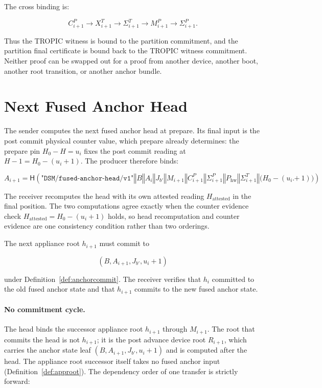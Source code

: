 \documentclass[11pt]{article}
\theoremstyle{definition}
\theoremstyle{remark}
\newcommand{\concat}{\ensuremath{\mathbin{\Vert}}}
\newcommand{\Hf}{\ensuremath{\mathsf{H}}}
\newcommand{\ctx}[1]{\texttt{"#1"}}
\newcommand{\Bundle}{\ensuremath{B}}
\newcommand{\Ahead}{\ensuremath{A}}
\newcommand{\Bhead}{\ensuremath{J}}
\newcommand{\pkh}{\ensuremath{P_{\mathrm{hw}}}}
\begin{document}
The cross binding is:

\[
C^P_{i+1}
\rightarrow X^T_{i+1}
\rightarrow \Sigma^T_{i+1}
\rightarrow M^P_{i+1}
\rightarrow \Sigma^P_{i+1}.
\]

Thus the TROPIC witness is bound to the partition commitment, and the partition final certificate
is bound back to the TROPIC witness commitment. Neither proof can be swapped out for a proof from
another device, another boot, another root transition, or another anchor bundle.

\section{Next Fused Anchor Head}

The sender computes the next fused anchor head at prepare. Its final input is the post commit
physical counter value, which prepare already determines: the prepare pin \(H_0-H=u_i\) fixes the
post commit reading at \(H-1=H_0-(u_i+1)\). The producer therefore binds:

\[
\Ahead_{i+1}
=
\Hf(
  \ctx{DSM/fused-anchor-head/v1}
  \concat \Bundle
  \concat \Ahead_i
  \concat \Bhead_{b'}
  \concat M_{i+1}
  \concat C^P_{i+1}
  \concat \Sigma^P_{i+1}
  \concat \pkh
  \concat \Sigma^T_{i+1}
  \concat \bigl(H_0-(u_i+1)\bigr)
).
\]

The receiver recomputes the head with its own attested reading \(H_{\mathrm{attested}}\) in the
final position. The two computations agree exactly when the counter evidence check
\(H_{\mathrm{attested}}=H_0-(u_i+1)\) holds, so head recomputation and counter evidence are one
consistency condition rather than two orderings.

The next appliance root \(h_{i+1}\) must commit to

\[
(
\Bundle,
\Ahead_{i+1},
\Bhead_{b'},
u_i+1
)
\]

under Definition~\ref{def:anchorcommit}. The receiver verifies that \(h_i\) committed to the old
fused anchor state and that \(h_{i+1}\) commits to the new fused anchor state.

\paragraph{No commitment cycle.}
The head binds the successor appliance root \(h_{i+1}\) through \(M_{i+1}\). The root that commits
the head is not \(h_{i+1}\); it is the post advance device root \(R_{i+1}\), which carries the
anchor state leaf \((\Bundle,\Ahead_{i+1},\Bhead_{b'},u_i+1)\) and is computed after the head.
The appliance root successor itself takes no fused anchor input
(Definition~\ref{def:approot}). The dependency order of one transfer is strictly forward:
\end{document}
